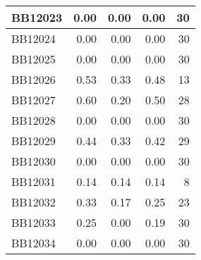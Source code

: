 \begin{longtable}{|l|r|r|r||r|}
	\hline
	BB12023 & \cellcolor[rgb]{ .988,  1,  .992}0.00 & \cellcolor[rgb]{ .988,  1,  .992}0.00 & \cellcolor[rgb]{ .988,  1,  .992}0.00 & \cellcolor[rgb]{ .973,  .412,  .42}30 \\
	\hline
	BB12024 & \cellcolor[rgb]{ .988,  1,  .992}0.00 & \cellcolor[rgb]{ .988,  1,  .992}0.00 & \cellcolor[rgb]{ .988,  1,  .992}0.00 & \cellcolor[rgb]{ .973,  .412,  .42}30 \\
	\hline
	BB12025 & \cellcolor[rgb]{ .988,  1,  .992}0.00 & \cellcolor[rgb]{ .988,  1,  .992}0.00 & \cellcolor[rgb]{ .988,  1,  .992}0.00 & \cellcolor[rgb]{ .973,  .412,  .42}30 \\
	\hline
	BB12026 & \cellcolor[rgb]{ .988,  1,  .992}0.53 & \cellcolor[rgb]{ .384,  .745,  .478}0.33 & \cellcolor[rgb]{ .816,  .925,  .847}0.48 & \cellcolor[rgb]{ .984,  .741,  .749}13 \\
	\hline
	BB12027 & \cellcolor[rgb]{ .988,  1,  .992}0.60 & \cellcolor[rgb]{ .384,  .745,  .478}0.20 & \cellcolor[rgb]{ .839,  .937,  .867}0.50 & \cellcolor[rgb]{ .976,  .451,  .459}28 \\
	\hline
	BB12028 & \cellcolor[rgb]{ .988,  1,  .992}0.00 & \cellcolor[rgb]{ .988,  1,  .992}0.00 & \cellcolor[rgb]{ .988,  1,  .992}0.00 & \cellcolor[rgb]{ .973,  .412,  .42}30 \\
	\hline
	BB12029 & \cellcolor[rgb]{ .988,  1,  .992}0.44 & \cellcolor[rgb]{ .384,  .745,  .478}0.33 & \cellcolor[rgb]{ .863,  .945,  .882}0.42 & \cellcolor[rgb]{ .976,  .431,  .439}29 \\
	\hline
	BB12030 & \cellcolor[rgb]{ .988,  1,  .992}0.00 & \cellcolor[rgb]{ .988,  1,  .992}0.00 & \cellcolor[rgb]{ .988,  1,  .992}0.00 & \cellcolor[rgb]{ .973,  .412,  .42}30 \\
	\hline
	BB12031 & \cellcolor[rgb]{ .988,  1,  .992}0.14 & \cellcolor[rgb]{ .988,  1,  .992}0.14 & \cellcolor[rgb]{ .988,  1,  .992}0.14 & \cellcolor[rgb]{ .984,  .835,  .847}8 \\
	\hline
	BB12032 & \cellcolor[rgb]{ .988,  1,  .992}0.33 & \cellcolor[rgb]{ .384,  .745,  .478}0.17 & \cellcolor[rgb]{ .698,  .875,  .745}0.25 & \cellcolor[rgb]{ .976,  .549,  .557}23 \\
	\hline
	BB12033 & \cellcolor[rgb]{ .988,  1,  .992}0.25 & \cellcolor[rgb]{ .384,  .745,  .478}0.00 & \cellcolor[rgb]{ .847,  .937,  .871}0.19 & \cellcolor[rgb]{ .973,  .412,  .42}30 \\
	\hline
	BB12034 & \cellcolor[rgb]{ .988,  1,  .992}0.00 & \cellcolor[rgb]{ .988,  1,  .992}0.00 & \cellcolor[rgb]{ .988,  1,  .992}0.00 & \cellcolor[rgb]{ .973,  .412,  .42}30 \\

\end{longtable}
